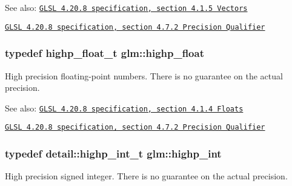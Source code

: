 \begin{Desc}
\item[See also:]\href{http://www.opengl.org/registry/doc/GLSLangSpec.4.20.8.pdf}{\tt GLSL 4.20.8 specification, section 4.1.5 Vectors} 

\href{http://www.opengl.org/registry/doc/GLSLangSpec.4.20.8.pdf}{\tt GLSL 4.20.8 specification, section 4.7.2 Precision Qualifier} \end{Desc}
\hypertarget{group__core__precision_g3d443a093adc053638ed7f81c5bfe300}{
\subsubsection[highp\_\-float]{\setlength{\rightskip}{0pt plus 5cm}typedef highp\_\-float\_\-t {\bf glm::highp\_\-float}}}
\label{group__core__precision_g3d443a093adc053638ed7f81c5bfe300}


High precision floating-point numbers. There is no guarantee on the actual precision.

\begin{Desc}
\item[See also:]\href{http://www.opengl.org/registry/doc/GLSLangSpec.4.20.8.pdf}{\tt GLSL 4.20.8 specification, section 4.1.4 Floats} 

\href{http://www.opengl.org/registry/doc/GLSLangSpec.4.20.8.pdf}{\tt GLSL 4.20.8 specification, section 4.7.2 Precision Qualifier} \end{Desc}
\hypertarget{group__core__precision_gafed5240eb0a43328cb75faf5fb0a8c2}{
\subsubsection[highp\_\-int]{\setlength{\rightskip}{0pt plus 5cm}typedef detail::highp\_\-int\_\-t {\bf glm::highp\_\-int}}}
\label{group__core__precision_gafed5240eb0a43328cb75faf5fb0a8c2}


High precision signed integer. There is no guarantee on the actual precision.

